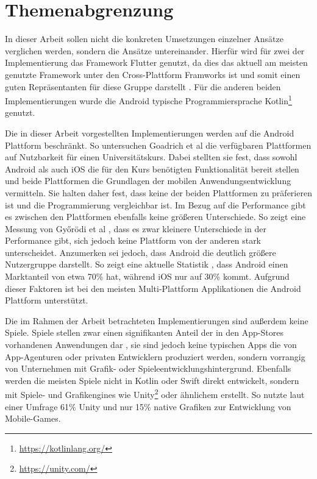 \section{Themenabgrenzung}
\label{cha:3_3abgrenzung}
In dieser Arbeit sollen nicht die konkreten Umsetzungen einzelner Ansätze verglichen werden, sondern die Ansätze untereinander. Hierfür wird für zwei der Implementierung das Framework Flutter genutzt, da dies das aktuell am meisten genutzte Framework unter den Cross-Plattform Framworks ist und somit einen guten Repräsentanten für diese Gruppe darstellt \cite{statist_CP_Framework}. Für die anderen beiden Implementierungen wurde die Android typische Programmiersprache Kotlin\footnote{\url{https://kotlinlang.org/}} genutzt. 

Die in dieser Arbeit vorgestellten Implementierungen werden auf die Android Plattform beschränkt. 
So untersuchen Goadrich et al \cite{iOSvsAndroid} die verfügbaren Plattformen auf Nutzbarkeit für einen Universitätskurs. 
Dabei stellten sie  fest, dass sowohl Android als auch iOS die für den Kurs benötigten Funktionalität bereit stellen und beide Plattformen die Grundlagen der mobilen Anwendungsentwicklung vermitteln. Sie halten daher fest, dass keine der beiden Plattformen zu präferieren ist und die Programmierung vergleichbar ist.
Im Bezug auf die Performance gibt es zwischen den Plattformen ebenfalls keine größeren Unterschiede. So zeigt eine Messung von Győrödi et al \cite{Android_IOS_Performance_comparison}, dass es zwar kleinere Unterschiede in der Performance gibt, sich jedoch keine Plattform von der anderen stark unterscheidet.
Anzumerken sei jedoch, dass Android die deutlich größere Nutzergruppe darstellt. So zeigt eine aktuelle Statistik \cite{statist_OS_worldwide}, dass Android einen Marktanteil von etwa 70\% hat, während iOS nur auf 30\% kommt. Aufgrund dieser Faktoren ist bei den meisten Multi-Plattform Applikationen die Android Plattform unterstützt.

Die im Rahmen der Arbeit betrachteten Implementierungen sind außerdem keine Spiele. Spiele stellen zwar einen signifikanten Anteil der in den App-Stores vorhandenen Anwendungen dar \cite{statist_games_appstore}, sie sind jedoch keine typischen Apps die von App-Agenturen oder privaten Entwicklern produziert werden, sondern vorrangig von Unternehmen mit Grafik- oder Spieleentwicklungshintergrund. Ebenfalls werden die meisten Spiele nicht in Kotlin oder Swift direkt entwickelt, sondern mit Spiele- und Grafikengines wie Unity\footnote{\url{https://unity.com/}} oder ähnlichem erstellt. So nutzte laut einer Umfrage \cite{unity_percantage_game_enginge} 61\% Unity und nur 15\% native Grafiken zur Entwicklung von Mobile-Games.

